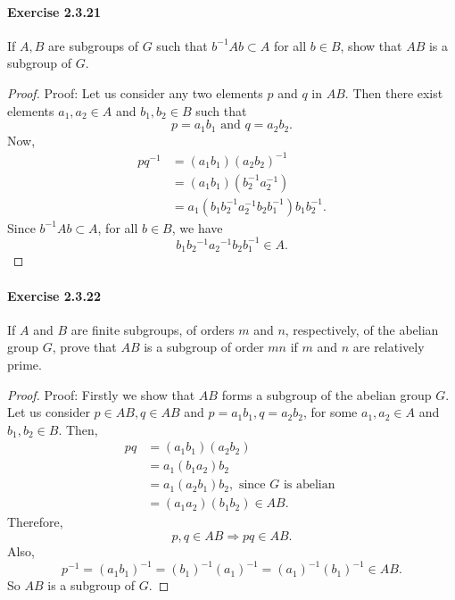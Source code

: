 \documentclass{article}
\begin{document}
\paragraph{Exercise 2.3.21} If $A, B$ are subgroups of $G$ such that $b^{-1} Ab \subset A$ for all $b \in B$, show that $AB$ is a subgroup of $G$.
\begin{proof}
    Proof: Let us consider any two elements $p$ and $q$ in $A B$. Then there exist elements $a_1, a_2 \in A$ and $b_1, b_2 \in B$ such that
$$
p=a_1 b_1 \text { and } q=a_2 b_2 .
$$
Now,
$$
\begin{aligned}
p q^{-1} & =\left(a_1 b_1\right)\left(a_2 b_2\right)^{-1} \\
& =\left(a_1 b_1\right)\left(b_2^{-1} a_2^{-1}\right) \\
& =a_1\left(b_1 b_2^{-1} a_2^{-1} b_2 b_1^{-1}\right) b_1 b_2^{-1} .
\end{aligned}
$$
Since $b^{-1} A b \subset A$, for all $b \in B$, we have
$$
b_1 b_2{ }^{-1} a_2{ }^{-1} b_2 b_1^{-1} \in A .
$$
\end{proof}


\paragraph{Exercise 2.3.22} If $A$ and $B$ are finite subgroups, of orders $m$ and $n$, respectively, of the abelian group $G$, prove that $AB$ is a subgroup of order $mn$ if $m$ and $n$ are relatively prime.
\begin{proof}
    Proof: Firstly we show that $A B$ forms a subgroup of the abelian group $G$. Let us consider $p \in A B, q \in A B$ and $p=a_1 b_1, q=a_2 b_2$, for some $a_1, a_2 \in A$ and $b_1, b_2 \in B$. Then,
$$
\begin{aligned}
p q & =\left(a_1 b_1\right)\left(a_2 b_2\right) \\
& =a_1\left(b_1 a_2\right) b_2 \\
& =a_1\left(a_2 b_1\right) b_2, \text { since } G \text { is abelian } \\
& =\left(a_1 a_2\right)\left(b_1 b_2\right) \in A B .
\end{aligned}
$$
Therefore,
$$
p, q \in A B \Longrightarrow p q \in A B .
$$
Also,
$$
p^{-1}=\left(a_1 b_1\right)^{-1}=\left(b_1\right)^{-1}\left(a_1\right)^{-1}=\left(a_1\right)^{-1}\left(b_1\right)^{-1} \in A B .
$$
So $A B$ is a subgroup of $G$.
\end{proof}
\end{document}

